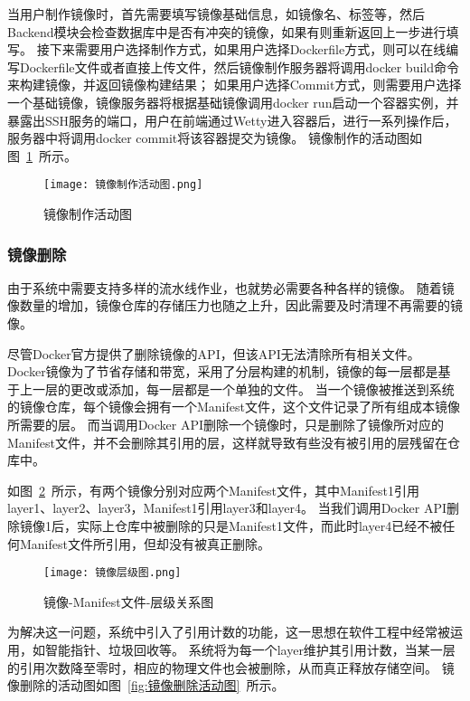当用户制作镜像时，首先需要填写镜像基础信息，如镜像名、标签等，然后Backend模块会检查数据库中是否有冲突的镜像，如果有则重新返回上一步进行填写。
接下来需要用户选择制作方式，如果用户选择Dockerfile方式，则可以在线编写Dockerfile文件或者直接上传文件，然后镜像制作服务器将调用docker build命令来构建镜像，并返回镜像构建结果；
如果用户选择Commit方式，则需要用户选择一个基础镜像，镜像服务器将根据基础镜像调用docker run启动一个容器实例，并暴露出SSH服务的端口，用户在前端通过Wetty进入容器后，进行一系列操作后，
服务器中将调用docker commit将该容器提交为镜像。
镜像制作的活动图如图~\ref{fig:镜像制作活动图}~所示。

\begin{figure}[h]
  \centering
  \texttt{[image: 镜像制作活动图.png]}
  \caption{镜像制作活动图}
  \label{fig:镜像制作活动图}
\end{figure}

\subsubsection{镜像删除}

由于系统中需要支持多样的流水线作业，也就势必需要各种各样的镜像。
随着镜像数量的增加，镜像仓库的存储压力也随之上升，因此需要及时清理不再需要的镜像。

尽管Docker官方提供了删除镜像的API，但该API无法清除所有相关文件。
Docker镜像为了节省存储和带宽，采用了分层构建的机制，镜像的每一层都是基于上一层的更改或添加，每一层都是一个单独的文件。
当一个镜像被推送到系统的镜像仓库，每个镜像会拥有一个Manifest文件，这个文件记录了所有组成本镜像所需要的层。
而当调用Docker API删除一个镜像时，只是删除了镜像所对应的Manifest文件，并不会删除其引用的层，这样就导致有些没有被引用的层残留在仓库中。

如图~\ref{fig:镜像-Manifest文件-层级关系图}~所示，有两个镜像分别对应两个Manifest文件，其中Manifest1引用layer1、layer2、layer3，Manifest1引用layer3和layer4。
当我们调用Docker API删除镜像1后，实际上仓库中被删除的只是Manifest1文件，而此时layer4已经不被任何Manifest文件所引用，但却没有被真正删除。

\begin{figure}[h]
  \centering
  \texttt{[image: 镜像层级图.png]}
  \caption{镜像-Manifest文件-层级关系图}
  \label{fig:镜像-Manifest文件-层级关系图}
\end{figure}

为解决这一问题，系统中引入了引用计数的功能，这一思想在软件工程中经常被运用，如智能指针、垃圾回收等。
系统将为每一个layer维护其引用计数，当某一层的引用次数降至零时，相应的物理文件也会被删除，从而真正释放存储空间。
镜像删除的活动图如图~\ref{fig:镜像删除活动图}~所示。

